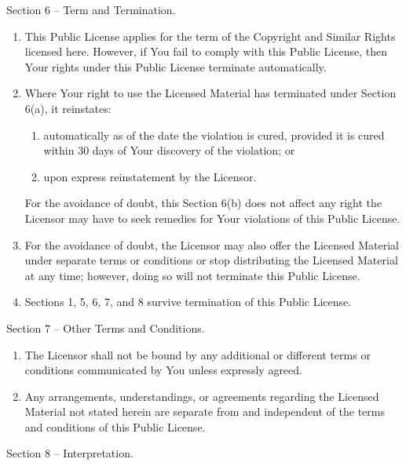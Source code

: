 \documentclass[]{article}
\begin{document}
Section 6 -- Term and Termination.

\begin{enumerate}
\def\labelenumi{\alph{enumi}.}
\item
  This Public License applies for the term of the Copyright and Similar
  Rights licensed here. However, if You fail to comply with this Public
  License, then Your rights under this Public License terminate
  automatically.
\item
  Where Your right to use the Licensed Material has terminated under
  Section 6(a), it reinstates:

  \begin{enumerate}
  \def\labelenumii{\arabic{enumii}.}
  \item
    automatically as of the date the violation is cured, provided it is
    cured within 30 days of Your discovery of the violation; or
  \item
    upon express reinstatement by the Licensor.
  \end{enumerate}

  For the avoidance of doubt, this Section 6(b) does not affect any
  right the Licensor may have to seek remedies for Your violations of
  this Public License.
\item
  For the avoidance of doubt, the Licensor may also offer the Licensed
  Material under separate terms or conditions or stop distributing the
  Licensed Material at any time; however, doing so will not terminate
  this Public License.
\item
  Sections 1, 5, 6, 7, and 8 survive termination of this Public License.
\end{enumerate}

Section 7 -- Other Terms and Conditions.

\begin{enumerate}
\def\labelenumi{\alph{enumi}.}
\item
  The Licensor shall not be bound by any additional or different terms
  or conditions communicated by You unless expressly agreed.
\item
  Any arrangements, understandings, or agreements regarding the Licensed
  Material not stated herein are separate from and independent of the
  terms and conditions of this Public License.
\end{enumerate}

Section 8 -- Interpretation.
\end{document}
